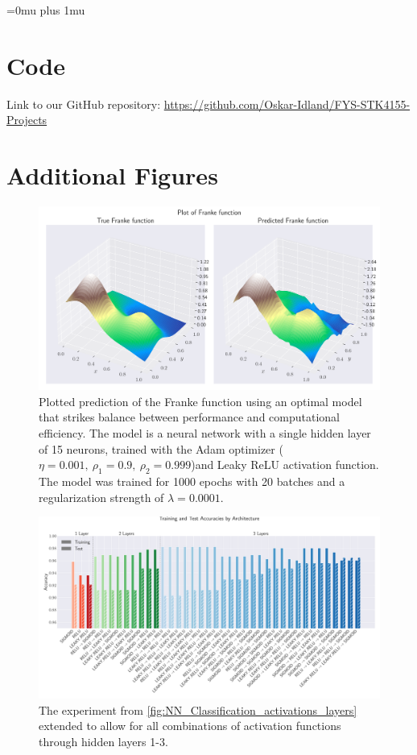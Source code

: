 \documentclass[aps,pra,english,notitlepage,reprint,nofootinbib]{revtex4-1}  %
\begin{document}
\Urlmuskip=0mu plus 1mu\relax
\onecolumngrid


\newpage
\appendix
\section{Code}\label{appsec:code}
Link to our GitHub repository: \href{https://github.com/Oskar-Idland/FYS-STK4155-Projects}{https://github.com/Oskar-Idland/FYS-STK4155-Projects}

\section{Additional Figures}\label{appsec:figures}
\begin{figure}[h!]
    \centering
    \includegraphics[width=0.9\columnwidth]{../figs/franke_model_pred.pdf}
    \caption{Plotted prediction of the Franke function using an optimal model that strikes balance between performance and computational efficiency. The model is a neural network with a single hidden layer of 15 neurons, trained with the Adam optimizer ($\eta = 0.001, \ \rho_1 = 0.9, \ \rho_2 = 0.999$)and Leaky ReLU activation function. The model was trained for 1000 epochs with 20 batches and a regularization strength of $\lambda = 0.0001$.}
    \label{fig:franke_model_pred}
\end{figure}
\begin{figure}[h!]
    \centering
    \includegraphics[width=1\textwidth]{../figs/classification_activations_layers_multi.pdf}
    \caption{The experiment from \cref{fig:NN_Classification_activations_layers} extended to allow for all combinations of activation functions through hidden layers 1-3.}
\end{figure}
\end{document}

